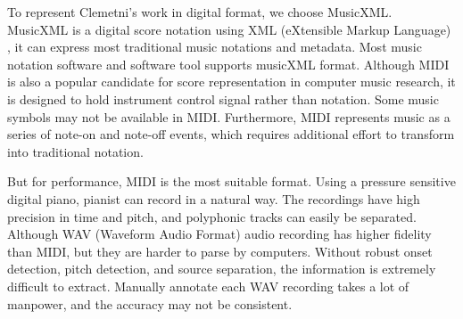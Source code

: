 To represent Clemetni's work in digital format, we choose MusicXML. MusicXML is a digital score notation using XML (eXtensible Markup Language) , it can express most traditional music notations and metadata. Most music notation software and software tool supports musicXML format. %
%
Although MIDI is also a popular candidate for score representation in computer music research, it is designed to hold instrument control signal rather than notation. Some music symbols may not be available in MIDI. Furthermore, MIDI represents music as a series of note-on and note-off events, which requires additional effort to transform into traditional notation.

But for performance, MIDI is the most suitable format. Using a pressure sensitive digital piano, pianist can record in a natural way. The recordings have high precision in time and pitch, and polyphonic tracks can easily be separated. Although WAV (Waveform Audio Format) audio recording has higher fidelity than MIDI, but they are harder to parse by computers. Without robust onset detection, pitch detection, and source separation, the information is extremely difficult to extract. Manually annotate each WAV recording takes a lot of manpower, and the accuracy may not be consistent. 

